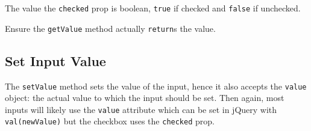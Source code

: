 \documentclass[
]{krantz}
\makeatletter
\newenvironment{Shaded}{\begin{snugshade}}{\end{snugshade}}
\newcommand{\CommentTok}[1]{\textcolor[rgb]{0.37,0.37,0.37}{\textit{#1}}}
\newcommand{\ControlFlowTok}[1]{\textcolor[rgb]{0.27,0.27,0.27}{\textbf{#1}}}
\newcommand{\DataTypeTok}[1]{\textcolor[rgb]{0.27,0.27,0.27}{#1}}
\newcommand{\FunctionTok}[1]{\textcolor[rgb]{0,0,0}{#1}}
\newcommand{\KeywordTok}[1]{\textcolor[rgb]{0.27,0.27,0.27}{\textbf{#1}}}
\newcommand{\NormalTok}[1]{#1}
\newcommand{\OperatorTok}[1]{\textcolor[rgb]{0.43,0.43,0.43}{\textbf{#1}}}
\newcommand{\StringTok}[1]{\textcolor[rgb]{0.5,0.5,0.5}{#1}}
\newenvironment{kframe}{%
\medskip{}
\setlength{\fboxsep}{.8em}
 \def\at@end@of@kframe{}%
 \ifinner\ifhmode%
  \def\at@end@of@kframe{\end{minipage}}%
  \begin{minipage}{\columnwidth}%
 \fi\fi%
 \def\FrameCommand##1{\hskip\@totalleftmargin \hskip-\fboxsep
 \colorbox{shadecolor}{##1}\hskip-\fboxsep
     \hskip-\linewidth \hskip-\@totalleftmargin \hskip\columnwidth}%
 \MakeFramed {\advance\hsize-\width
   \@totalleftmargin\z@ \linewidth\hsize
   \@setminipage}}%
 {\par\unskip\endMakeFramed%
 \at@end@of@kframe}
\renewenvironment{Shaded}{\begin{kframe}}{\end{kframe}}
\newenvironment{rmdblock}[1]
  {
  \begin{itemize}
  \renewcommand{\labelitemi}{
    \raisebox{-.7\height}[0pt][0pt]{
      {\setkeys{Gin}{width=3em,keepaspectratio}\texttt{[image: images/\#1]}}
    }
  }
  \setlength{\fboxsep}{1em}
  \begin{kframe}
  \item
  }
  {
  \end{kframe}
  \end{itemize}
  }
\newenvironment{rmdnote}
  {\begin{rmdblock}{note}}
  {\end{rmdblock}}
\makeatother
\begin{document}
\begin{Shaded}
\end{Shaded}

The value the \texttt{checked} prop is boolean, \texttt{true} if checked and \texttt{false} if unchecked.

\begin{rmdnote}
Ensure the \texttt{getValue} method actually \texttt{return}s the value.
\end{rmdnote}

\hypertarget{shiny-input-set-value}{%
\subsection{Set Input Value}\label{shiny-input-set-value}}

The \texttt{setValue} method sets the value of the input, hence it also accepts the \texttt{value} object: the actual value to which the input should be set. Then again, most inputs will likely use the \texttt{value} attribute which can be set in jQuery with \texttt{val(newValue)} but the checkbox uses the \texttt{checked} prop.
\end{document}
